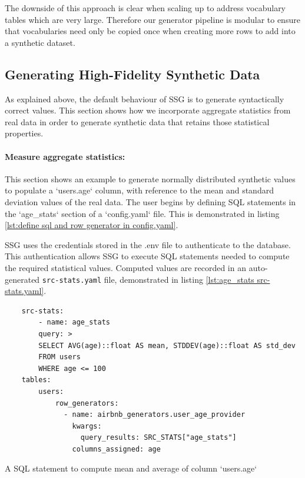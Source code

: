 \documentclass[11pt]{article}
\begin{document}
The downside of this approach is clear when scaling up to address vocabulary tables which are very large. Therefore our generator pipeline is modular to ensure that vocabularies need only be copied once when creating more rows to add into a synthetic dataset. 

\subsection{Generating High-Fidelity Synthetic Data}

As explained above, the default behaviour of SSG is to generate syntactically correct values. This section shows how we incorporate aggregate statistics from real data in order to generate synthetic data that retains those statistical properties. 

\paragraph{Measure aggregate statistics:}
This section shows an example to generate normally distributed synthetic values to populate a `users.age` column, with reference to the mean and standard deviation values of the real data. The user begins by defining SQL statements in the `age\_stats` section of a `config.yaml` file. This is demonstrated in listing \ref{lst:define sql and row generator in config.yaml}. 

SSG uses the credentials stored in the .env file to authenticate to the database. This authentication allows SSG to execute SQL statements needed to compute the required statistical values. Computed values are recorded in an auto-generated \texttt{src-stats.yaml} file, demonstrated in listing \ref{lst:age_stats src-stats.yaml}. 

\begin{listing}[H]
\begin{verbatim}
    src-stats:
        - name: age_stats
        query: >
        SELECT AVG(age)::float AS mean, STDDEV(age)::float AS std_dev
        FROM users
        WHERE age <= 100
    tables:
        users:
            row_generators:
              - name: airbnb_generators.user_age_provider
                kwargs:
                  query_results: SRC_STATS["age_stats"]
                columns_assigned: age
\end{verbatim}
\caption{A SQL statement to compute mean and average of column `users.age` }
\label{lst:define sql and row generator in config.yaml}
\end{listing}
\end{document}
